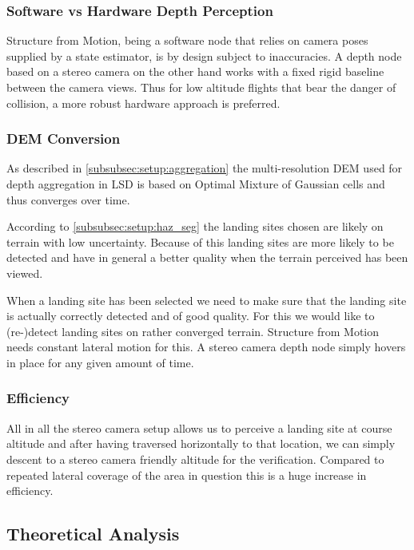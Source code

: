 \subsubsection{Software vs Hardware Depth Perception}

Structure from Motion, being a software node that relies on camera poses supplied by a state estimator, is by design subject to inaccuracies. A depth node based on a stereo camera on the other hand works with a fixed rigid baseline between the camera views. Thus for low altitude flights that bear the danger of collision, a more robust hardware approach is preferred.

\subsubsection{DEM Conversion}

As described in \cref{subsubsec:setup:aggregation} the multi-resolution DEM used for depth aggregation in LSD is based on Optimal Mixture of Gaussian cells and thus converges over time. 

According to \cref{subsubsec:setup:haz_seg} the landing sites chosen are likely on terrain with low uncertainty. Because of this landing sites are more likely to be detected and have in general a better quality when the terrain perceived has been viewed.

When a landing site has been selected we need to make sure that the landing site is actually correctly detected and of good quality. For this we would like to (re-)detect landing sites on rather converged terrain. Structure from Motion needs constant lateral motion for this. A stereo camera depth node simply hovers in place for any given amount of time.

\subsubsection{Efficiency}

All in all the stereo camera setup allows us to perceive a landing site at course altitude and after having traversed horizontally to that location, we can simply descent to a stereo camera friendly altitude for the verification. Compared to repeated lateral coverage of the area in question this is a huge increase in efficiency.

\subsection{Theoretical Analysis}

